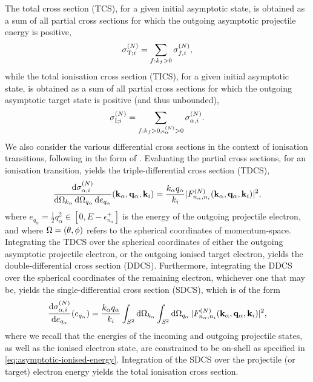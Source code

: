 \documentclass[draft]{article}
\begin{document}
The total cross section (TCS), for a given initial asymptotic state, is obtained
as a sum of all partial cross sections for which the outgoing asymptotic
projectile energy is positive,
\begin{equation}
  \label{eq:total-cross-section}
  \sigma_{\mathrm{T}; i}^{(N)}
  =
  \sum_{f : k_{f} > 0}
  \sigma_{f, i}^{(N)}
  ,
\end{equation}
while the total ionisation cross section (TICS), for a given initial asymptotic
state, is obtained as a sum of all partial cross sections for which the outgoing
asymptotic target state is positive (and thus unbounded),
\begin{equation}
  \label{eq:total-ionisation-cross-section}
  \sigma_{\mathrm{I}; i}^{(N)}
  =
  \sum_{f : k_{f} > 0, \epsilon_{\alpha}^{(N)} > 0}
  \sigma_{\alpha, i}^{(N)}
  .
\end{equation}
We also consider the various differential cross sections in the context of
ionisation transitions, following in the form of \cite{PhysRevA.54.2991}.
Evaluating the partial cross sections, for an ionisation transition, yields the
triple-differential cross section (TDCS),
\begin{equation}
  \label{eq:triple-differential-cross-section}
  \dfrac
  {
    \dd{\sigma_{\alpha, i}^{(N)}}
  }
  {
    \dd{\Omega_{k_{\alpha}}}
    \dd{\Omega_{q_{\alpha}}}
    \dd{e_{q_{\alpha}}}
  }
  (
    \vb{k}_{\alpha}, \vb{q}_{\alpha}, \vb{k}_{i}
  )
  =
  \dfrac{k_{\alpha} q_{\alpha}}{k_{i}}
  \lvert
    F_{n_{\alpha}, n_{i}}^{(N)}(
      \vb{k}_{\alpha}, \vb{q}_{\alpha}, \vb{k}_{i}
    )
  \rvert^{2}
  ,
\end{equation}
where $e_{q_{\alpha}} = \tfrac{1}{2} q_{\alpha}^{2} \in [0, E - \epsilon_{n_{\alpha}}^{+}]$ is the energy of the outgoing
projectile electron, and where $\Omega = (\theta, \phi)$ refers to the
spherical coordinates of momentum-space.
Integrating the TDCS over the spherical coordinates of either the outgoing
asymptotic projectile electron, or the outgoing ionised target electron, yields
the double-differential cross section (DDCS).
Furthermore, integrating the DDCS over the spherical coordinates of the
remaining electron, whichever one that may be, yields the single-differential
cross section (SDCS), which is of the form
\begin{equation}
  \label{eq:single-differential-cross-section}
  \dv{\sigma_{\alpha, i}^{\lr{N}}}{e_{q_{\alpha}}}\lr{e_{q_{\alpha}}}
  =
  \dfrac{k_{\alpha} q_{\alpha}}{k_{i}}
  \int_{S^{2}}
  \dd{\Omega_{k_{\alpha}}}
  \int_{S^{2}}
  \dd{\Omega_{q_{\alpha}}}
  \lrabs
  {
    F_{n_{\alpha}, n_{i}}^{\lr{N}}\lr
    {
      \vb{k}_{\alpha}, \vb{q}_{\alpha}, \vb{k}_{i}
    }
  }^{2}
  ,
\end{equation}
where we recall that the energies of the incoming and outgoing projectile
states, as well as the ionised electron state, are constrained to be on-shell as
specified in \autoref{eq:asymptotic-ionised-energy}.
Integration of the SDCS over the projectile (or target) electron energy yields
the total ionisation cross section.
\end{document}
